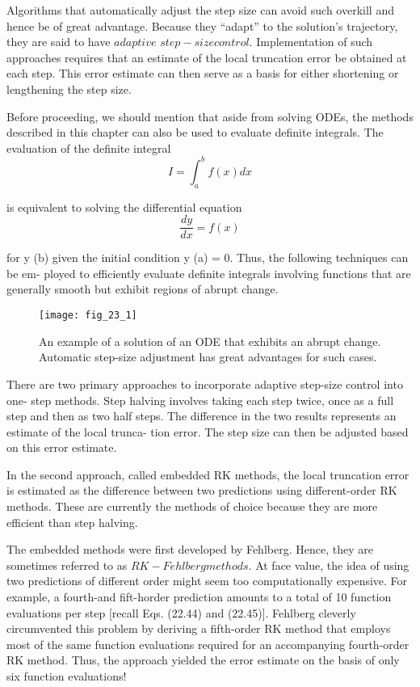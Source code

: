 \documentclass[../main.tex]{subfiles}
\begin{document}
Algorithms that automatically adjust the step size can avoid such overkill and hence be
of great advantage. Because they ``adapt'' to the solution's trajectory, they are said to have $adaptive$ $step-size control$. Implementation of such approaches requires that an estimate of
the local truncation error be obtained at each step. This error estimate can then serve as a
basis for either shortening or lengthening the step size.

Before proceeding, we should mention that aside from solving ODEs, the methods
described in this chapter can also be used to evaluate definite integrals. The evaluation of
the definite integral
\begin{equation}
    I=\int_{a}^{b} f(x) dx   \nonumber 
\end{equation}


is equivalent to solving the differential equation
\begin{equation}
    \frac{dy}{dx} = f(x)    \nonumber
\end{equation}

for y (b) given the initial condition y (a) = 0. Thus, the following techniques can be em-
ployed to efficiently evaluate definite integrals involving functions that are generally
smooth but exhibit regions of abrupt change.

\begin{figure}[H]
    \centering
    \texttt{[image: fig\_23\_1]}
   \caption{\textsf{An example of a solution of an ODE that exhibits an abrupt change. Automatic step-size adjustment has great advantages for such cases.}}\label{fig:fig_23_1}
\end{figure}
There are two primary approaches to incorporate adaptive step-size control into one-
step methods. Step halving involves taking each step twice, once as a full step and then as
two half steps. The difference in the two results represents an estimate of the local trunca-
tion error. The step size can then be adjusted based on this error estimate.

In the second approach, called embedded RK methods, the local truncation error is estimated as the difference between two predictions using different-order RK methods. These
are currently the methods of choice because they are more efficient than step halving.

The embedded methods were first developed by Fehlberg. Hence, they are sometimes
referred to as $RK-Fehlberg methods$. At face value, the idea of using two predictions of different order might seem too computationally expensive. For example, a fourth-and fift-horder prediction amounts to a total of 10 function evaluations per step [recall Eqs. (22.44)
and (22.45)]. Fehlberg cleverly circumvented this problem by deriving a fifth-order RK
method that employs most of the same function evaluations required for an accompanying
fourth-order RK method. Thus, the approach yielded the error estimate on the basis of only
six function evaluations!
\end{document}
